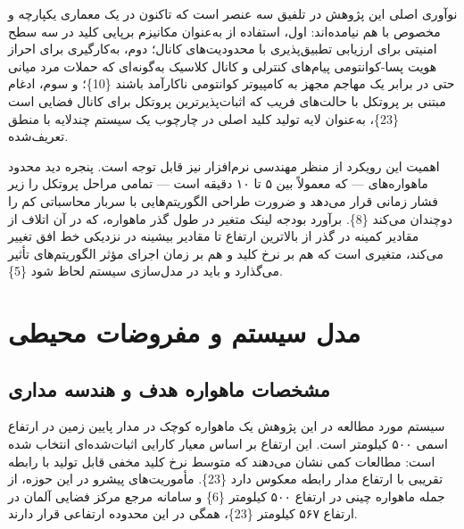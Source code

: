 \documentclass[a4paper,14pt]{extreport}
\begin{document}
نوآوری اصلی این پژوهش در تلفیق سه عنصر است که تاکنون در یک معماری یکپارچه و مخصوص  با هم نیامده‌اند: اول، استفاده از  به‌عنوان مکانیزم برپایی کلید  در سه سطح امنیتی  برای ارزیابی تطبیق‌پذیری با محدودیت‌های کانال؛ دوم، به‌کارگیری  برای احراز هویت پسا-کوانتومی  پیام‌های کنترلی و کانال کلاسیک  به‌گونه‌ای که حملات مرد میانی  حتی در برابر یک مهاجم مجهز به کامپیوتر کوانتومی ناکارآمد باشند \{10\}؛ و سوم، ادغام  مبتنی بر پروتکل  با حالت‌های فریب  که اثبات‌پذیرترین پروتکل برای کانال فضایی است \{23\}، به‌عنوان لایه تولید کلید اصلی  در چارچوب یک سیستم چندلایه با منطق  تعریف‌شده.

اهمیت این رویکرد از منظر مهندسی نرم‌افزار نیز قابل توجه است. پنجره دید محدود ماهواره‌های  --- که معمولاً بین ۵ تا ۱۰ دقیقه است --- تمامی مراحل پروتکل را زیر فشار زمانی قرار می‌دهد و ضرورت طراحی الگوریتم‌هایی با سربار محاسباتی کم را دوچندان می‌کند \{8\}. برآورد بودجه لینک  متغیر در طول گذر ماهواره، که در آن اتلاف از مقادیر کمینه در گذر از بالاترین ارتفاع تا مقادیر بیشینه در نزدیکی خط افق تغییر می‌کند، متغیری است که هم بر نرخ کلید  و هم بر زمان اجرای مؤثر الگوریتم‌های  تأثیر می‌گذارد و باید در مدل‌سازی سیستم لحاظ شود \{5\}.

\section{مدل سیستم و مفروضات محیطی}
\subsection{مشخصات ماهواره هدف و هندسه مداری}

سیستم مورد مطالعه در این پژوهش یک ماهواره کوچک در مدار پایین زمین  در ارتفاع اسمی ۵۰۰ کیلومتر است. این ارتفاع بر اساس معیار کارایی اثبات‌شده‌ای انتخاب شده است: مطالعات کمی نشان می‌دهند که متوسط نرخ کلید مخفی قابل تولید با رابطه تقریبی  با ارتفاع مدار رابطه معکوس دارد \{23\}. مأموریت‌های پیشرو در این حوزه، از جمله ماهواره  چینی در ارتفاع ۵۰۰ کیلومتر \{6\} و سامانه مرجع مرکز فضایی آلمان  در ارتفاع ۵۶۷ کیلومتر \{23\}، همگی در این محدوده ارتفاعی قرار دارند.
\end{document}
